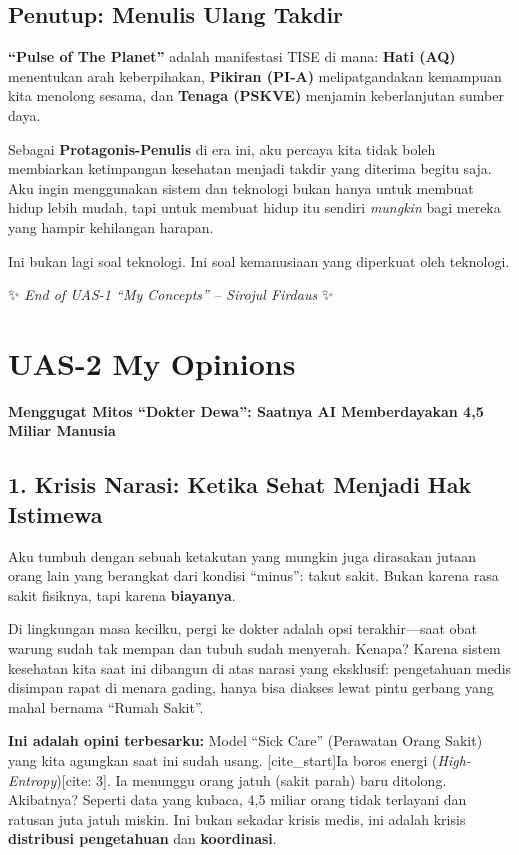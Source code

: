 \documentclass[
  letterpaper,
  DIV=11,
  numbers=noendperiod]{scrreprt}
\begin{document}
\section{Penutup: Menulis Ulang
Takdir}\label{penutup-menulis-ulang-takdir}

\textbf{``Pulse of The Planet''} adalah manifestasi TISE di mana:
\textbf{Hati (AQ)} menentukan arah keberpihakan, \textbf{Pikiran (PI-A)}
melipatgandakan kemampuan kita menolong sesama, dan \textbf{Tenaga
(PSKVE)} menjamin keberlanjutan sumber daya.

Sebagai \textbf{Protagonis-Penulis} di era ini, aku percaya kita tidak
boleh membiarkan ketimpangan kesehatan menjadi takdir yang diterima
begitu saja. Aku ingin menggunakan sistem dan teknologi bukan hanya
untuk membuat hidup lebih mudah, tapi untuk membuat hidup itu sendiri
\emph{mungkin} bagi mereka yang hampir kehilangan harapan.

Ini bukan lagi soal teknologi. Ini soal kemanusiaan yang diperkuat oleh
teknologi.

✨ \emph{End of UAS-1 ``My Concepts'' -- Sirojul Firdaus} ✨

\chapter{UAS-2 My Opinions}\label{uas-2-my-opinions}

\textbf{Menggugat Mitos ``Dokter Dewa'': Saatnya AI Memberdayakan 4,5
Miliar Manusia}

\section{1. Krisis Narasi: Ketika Sehat Menjadi Hak
Istimewa}\label{krisis-narasi-ketika-sehat-menjadi-hak-istimewa}

Aku tumbuh dengan sebuah ketakutan yang mungkin juga dirasakan jutaan
orang lain yang berangkat dari kondisi ``minus'': takut sakit. Bukan
karena rasa sakit fisiknya, tapi karena \textbf{biayanya}.

Di lingkungan masa kecilku, pergi ke dokter adalah opsi terakhir---saat
obat warung sudah tak mempan dan tubuh sudah menyerah. Kenapa? Karena
sistem kesehatan kita saat ini dibangun di atas narasi yang eksklusif:
pengetahuan medis disimpan rapat di menara gading, hanya bisa diakses
lewat pintu gerbang yang mahal bernama ``Rumah Sakit''.

\textbf{Ini adalah opini terbesarku:} Model ``Sick Care'' (Perawatan
Orang Sakit) yang kita agungkan saat ini sudah usang.
{[}cite\_start{]}Ia boros energi (\emph{High-Entropy}){[}cite: 3{]}. Ia
menunggu orang jatuh (sakit parah) baru ditolong. Akibatnya? Seperti
data yang kubaca, 4,5 miliar orang tidak terlayani dan ratusan juta
jatuh miskin. Ini bukan sekadar krisis medis, ini adalah krisis
\textbf{distribusi pengetahuan} dan \textbf{koordinasi}.
\end{document}
